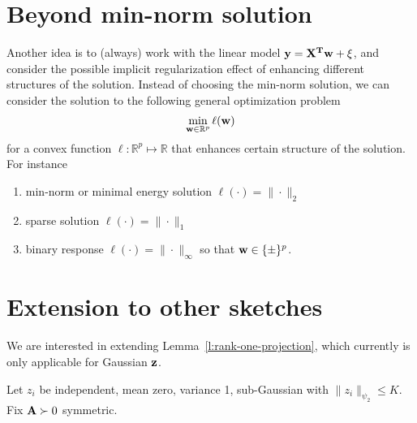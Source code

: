 \documentclass[11pt]{article}
\begin{document}





\section{Beyond min-norm solution}

Another idea is to (always) work with the linear model $\mathbf y = \mathbf X^{\mathbf{T}} \mathbf w + \xi$, and consider the possible implicit regularization effect of enhancing different structures of the solution. Instead of choosing the min-norm solution, we can consider the solution to the following general optimization problem
\[
  \min_{\mathbf w \in \mathbb R^p} \ell(\mathbf w)
\]
for a convex function $\ell: \mathbb R^p \mapsto \mathbb R$ that enhances certain structure of the solution. For instance
\begin{enumerate}
  \item min-norm or minimal energy solution $\ell(\cdot) = \| \cdot \|_2$
  \item sparse solution $\ell(\cdot) = \| \cdot \|_1$
  \item binary response $\ell(\cdot) = \| \cdot \|_\infty$ so that $\mathbf w \in \{ \pm \}^p$.
\end{enumerate}

\section{Extension to other sketches}

We are interested in extending Lemma~\ref{l:rank-one-projection},
which currently is only applicable for Gaussian $\mathbf z$.

Let $z_i$ be independent, mean zero, variance 1, sub-Gaussian
with $\|z_i\|_{\psi_2} \leq K$.
Fix $\mathbf A \succ 0$ symmetric.
\end{document}
